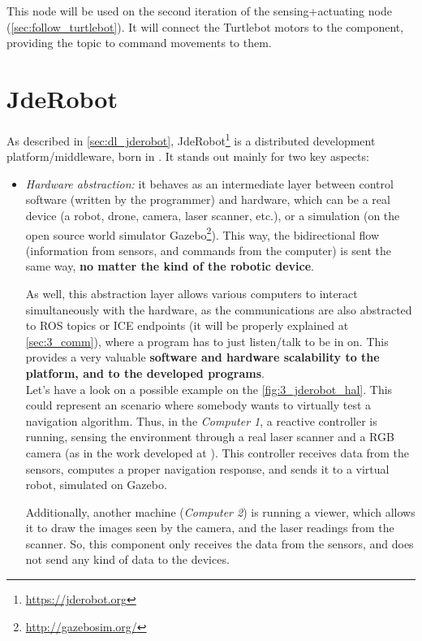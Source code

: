 		This node will be used on the second iteration of the sensing+actuating node (\autoref{sec:follow_turtlebot}). It will connect the Turtlebot motors to the component, providing the topic to command movements to them.
	
	
\section{JdeRobot}
	As described in \autoref{sec:dl_jderobot}, JdeRobot\footnote{\url{https://jderobot.org}} is a distributed development platform/middleware, born in \cite{jmplaza-phd}. It stands out mainly for two key aspects:
	\begin{itemize}
		\item \textit{Hardware abstraction:} it behaves as an intermediate layer between control software (written by the programmer) and hardware, which can be a real device (a robot, drone, camera, laser scanner, etc.), or a simulation (on the open source world simulator Gazebo\footnote{\url{http://gazebosim.org/}}). This way, the bidirectional flow (information from sensors, and commands from the computer) is sent the same way, \textbf{no matter the kind of the robotic device}.
		
		As well, this abstraction layer allows various computers to interact simultaneously with the hardware, as the communications are also abstracted to ROS topics or ICE endpoints (it will be properly explained at \autoref{sec:3_comm}), where a program has to just listen/talk to be in on. This provides a very valuable \textbf{software and hardware scalability to the platform, and to the developed programs}.\\
		
		Let's have a look on a possible example on the \autoref{fig:3_jderobot_hal}. This could represent an scenario where somebody wants to virtually test a navigation algorithm. Thus, in the \emph{Computer 1}, a reactive controller is running, sensing the environment through a real laser scanner and a RGB camera (as in the work developed at \cite{rocapal}). This controller receives data from the sensors, computes a proper navigation response, and sends it to a virtual robot, simulated on Gazebo.
		
		Additionally, another machine (\emph{Computer 2}) is running a viewer, which allows it to draw the images seen by the camera, and the laser readings from the scanner. So, this component only receives the data from the sensors, and does not send any kind of data to the devices.
		

\end{itemize}
